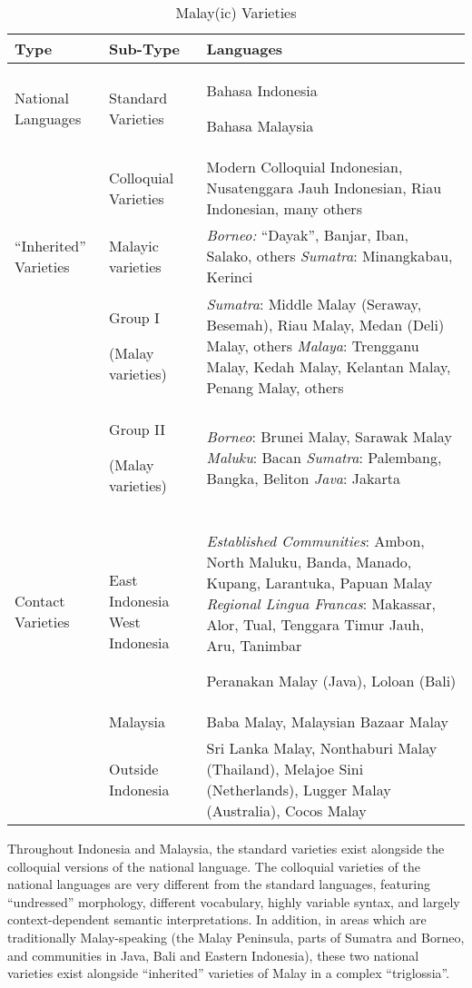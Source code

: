 \begin{table}
\begin{tabular}{llp{5cm}}
\hline
\textbf{Type} &
\textbf{Sub-Type} &
\textbf{Languages}\\\hline
National Languages &
Standard Varieties &
Bahasa Indonesia

Bahasa Malaysia\\\hhline{~--}
 &
Colloquial Varieties &
Modern Colloquial Indonesian, Nusatenggara Jauh Indonesian, Riau Indonesian, many others\\\hline
``Inherited'' Varieties &
Malayic varieties &
\textit{Borneo: }``Dayak'', Banjar, Iban, Salako, others
\newline
\textit{Sumatra}: Minangkabau, Kerinci\\\hhline{~--}
 &
Group I 

(Malay varieties) &
\textit{Sumatra}: Middle Malay (Seraway, Besemah), Riau Malay, Medan (Deli) Malay, others
\newline
\textit{Malaya}: Trengganu Malay, Kedah Malay, Kelantan Malay, Penang Malay, others\\\hhline{~--}
 &
Group II 

(Malay varieties) &
\textit{Borneo}: Brunei Malay, Sarawak Malay
\newline
\textit{Maluku}: Bacan
\newline
\textit{Sumatra}: Palembang, Bangka, Beliton
\newline
\textit{Java}: Jakarta\\\hline
Contact Varieties &
East Indonesia
\newline
West Indonesia &
\textit{Established Communities}: Ambon, North Maluku, Banda, Manado, Kupang, Larantuka,  Papuan Malay
\newline
\textit{Regional Lingua Francas}: Makassar, Alor, Tual, Tenggara Timur Jauh, Aru, Tanimbar

Peranakan Malay (Java), Loloan (Bali)\\\hhline{~--}
 &
Malaysia &
Baba Malay, Malaysian Bazaar Malay\\\hhline{~--}
 &
Outside Indonesia &
Sri Lanka Malay, Nonthaburi Malay (Thailand), Melajoe Sini (Netherlands), Lugger Malay (Australia), Cocos Malay\\\hline
\end{tabular}
\caption{Malay(ic) Varieties}
\label{paauw:tab:malayicvarieties}
\end{table}

Throughout Indonesia and Malaysia, the standard varieties exist alongside the colloquial versions of the national language. The colloquial varieties of the national languages are very different from the standard languages, featuring ``undressed'' morphology, different vocabulary, highly variable syntax, and largely context-dependent semantic interpretations. In addition, in areas which are traditionally Malay-speaking (the Malay Peninsula, parts of Sumatra and Borneo, and communities in Java, Bali and Eastern Indonesia), these two national varieties exist alongside ``inherited'' varieties of Malay in a complex ``triglossia''.

